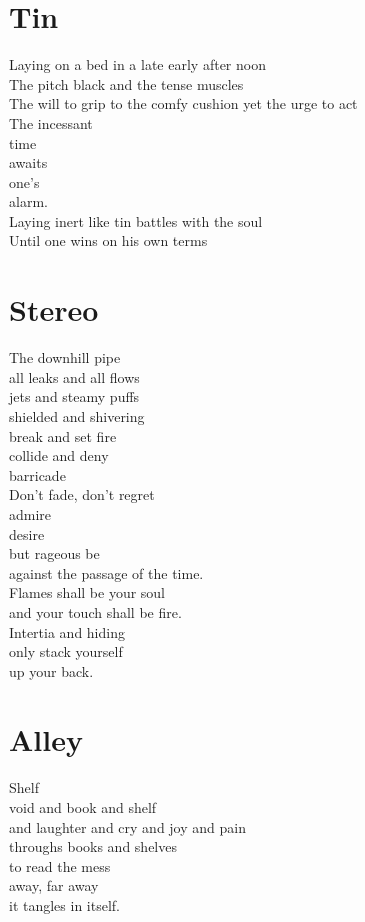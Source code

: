 \documentclass[a4paper,twoside, openany]{book}
\newenvironment{Verse}
  {\center\varwidth{\linewidth}\fontsize{18}{21.6}\selectfont}
  {\endvarwidth\endcenter}
\begin{document}
\chapter{Tin}
\begin{Verse}
    Laying on a bed in a late early after noon\\
    The pitch black and the tense muscles\\
    The will to grip to the comfy cushion yet the urge to act\\
    The incessant\\ time\\ awaits\\ one's\\ alarm.\\
    Laying inert like tin battles with the soul\\
    Until one wins on his own terms
\end{Verse}

\chapter{Stereo}
\begin{Verse}
    The downhill pipe\\
    all leaks and all flows\\
    jets and steamy puffs\\
    shielded and shivering\\
    break and set fire\\
    collide and deny\\
    barricade\\
    Don't fade, don't regret\\admire\\desire\\
    but rageous be \\  
    against the passage of the time.\\
    Flames shall be your soul\\
    and your touch shall be fire.\\
    Intertia and hiding\\
    only stack yourself\\
    up your back.
\end{Verse}

\chapter{Alley}
\begin{Verse}
    Shelf\\
    void and book and shelf\\
    and laughter and cry and joy and pain\\
    throughs books and shelves\\
    to read the mess\\
    away, far away\\
    it tangles in itself.
\end{Verse}
\end{document}

